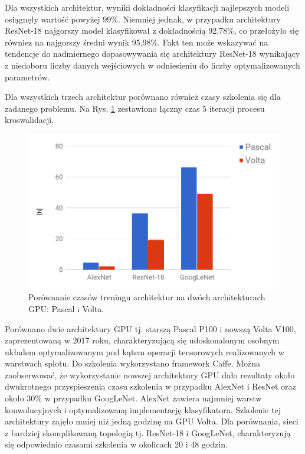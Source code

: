 Dla wszystkich architektur, wyniki dokładności klasyfikacji najlepszych modeli osiągnęły wartość powyżej 99\%. Niemniej jednak, w przypadku architektury ResNet-18 najgorszy model klasyfikował z dokładnością 92,78\%, co przełożyło się równiez na najgorszy średni wynik 95,98\%. Fakt ten może wskazywać na tendencje do nadmiernego dopasowywania się architektury ResNet-18 wynikający z niedoboru liczby danych wejściowych w odniesieniu do liczby optymalizowanych parametrów.

Dla wszystkich trzech architektur porównano również czasy szkolenia się dla zadanego problemu. Na Rys. \ref{fig:training_times} zestawiono łączny czas 5 iteracji procesu kroswalidacji.
\begin{figure}[h!]
	\includegraphics[width=\textwidth]{figures/TrainingtimesChart.png}
	\caption{Porównanie czasów treningu architektur na dwóch architekturach GPU: Pascal i Volta.}
	\label{fig:training_times}
\end{figure}
Porównano dwie architektury GPU tj. starszą Pascal P100 i nowszą Volta V100, zaprezentowaną w 2017 roku, charakteryzującą się udoskonalonym osobnym układem optymalizowanym pod kątem operacji tensorowych realizowanych w warstwach splotu. Do szkolenia wykorzystano framework Caffe. Można zaobserwować, że wykorzystanie nowszej architektury GPU dało rezultaty około dwukrotnego przyspieszenia czasu szkolenia w przypadku AlexNet i ResNet oraz około 30\% w przypadku GoogLeNet. AlexNet zawiera najmniej warstw konwolucyjnych i optymalizowaną implementację klasyfikatora. Szkolenie tej architektury zajęło mniej niż jedną godzinę na GPU Volta. Dla porównania, sieci z bardziej skomplikowaną topologią tj. ResNet-18 i GoogLeNet, charakteryzują się odpowiednio czasami szkolenia w okolicach 20 i 48 godzin. 


